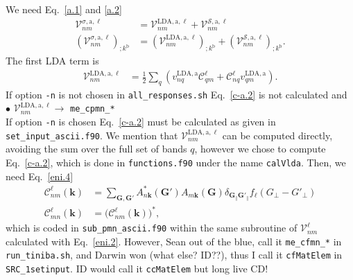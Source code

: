 We need Eq.~\eqref{a.1} and \eqref{a.2}
\begin{align}\label{c-a.1}
\mathcal{V}^{\sigma,\mathrm{a},\ell}_{nm}
&=
\mathcal{V}^{\mathrm{LDA},\mathrm{a},\ell}_{nm}
+
\mathcal{V}^{\mathcal{S},\mathrm{a},\ell}_{nm}
\nonumber\\
\left(
\mathcal{V}^{\sigma,\mathrm{a},\ell}_{nm}
\right)_{;k^\mathrm{b}}
&=
\left(
\mathcal{V}^{\mathrm{LDA},\mathrm{a},\ell}_{nm}
\right)_{;k^\mathrm{b}}
+
\left(
\mathcal{V}^{\mathcal{S},\mathrm{a},\ell}_{nm}
\right)_{;k^\mathrm{b}}
.
\end{align}
 The first LDA term is
\begin{align}\label{c-a.2}
\mathcal{V}^{\mathrm{LDA},\mathrm{a},\ell}_{nm}
&=
\frac{1}{2}\sum_q\left(
v^{\mathrm{LDA},\mathrm{a}}_{nq}\mathcal{C}^\ell_{qm}+\mathcal{C}^\ell_{nq} v^{\mathrm{LDA},\mathrm{a}}_{qm}
\right)
.
\end{align} 
If option \verb=-n= is not chosen in \verb=all_responses.sh=
Eq.~\eqref{c-a.2}
 is
not calculated and\\
$\bullet$ $\mathcal{V}^{\mathrm{LDA},\mathrm{a},\ell}_{nm}\to$ \verb=me_cpmn_*=\\  
If option \verb=-n= is chosen Eq.~\eqref{c-a.2}
 must be calculated as given in
\verb=set_input_ascii.f90=. We mention that
$\mathcal{V}^{\mathrm{LDA},\mathrm{a},\ell}_{nm}$ can be computed directly,\cite{nicolaspc}
avoiding the sum over the full set of bands $q$, however we chose to
compute Eq.~\eqref{c-a.2}, which is done in
\verb=functions.f90= under the name \verb=calVlda=.
Then, we need 
Eq.~\eqref{eni.4}
\begin{align}\label{c-eni.4}
\mathcal{C}^\ell_{nm}(\mathbf{k})&=
\sum_{\mathbf{G},\mathbf{G}'} A^*_{n\mathbf{k}}(\mathbf{G}')  A_{m\mathbf{k}}(\mathbf{G})
\delta_{\mathbf{G}_\parallel \mathbf{G}'_\parallel}
f_\ell(G_\perp-G'_\perp)
\nonumber\\
\mathcal{C}^\ell_{mn}(\mathbf{k})&=
\big(\mathcal{C}^\ell_{nm}(\mathbf{k})\big)^*
,
\end{align} 
which is coded in \verb=sub_pmn_ascii.f90= within the same subroutine of $\boldsymbol{\mathcal{V}}^\ell_{nm}$
calculated with Eq.~\eqref{eni.2}. However, Sean out of the blue, call
it \verb=me_cfmn_*= in \verb=run_tiniba.sh=,
 and Darwin won (what else? ID??), 
thus I call it \verb=cfMatElem= in \verb=SRC_1setinput=. ID would call
it  \verb=ccMatElem=
but long live CD!

